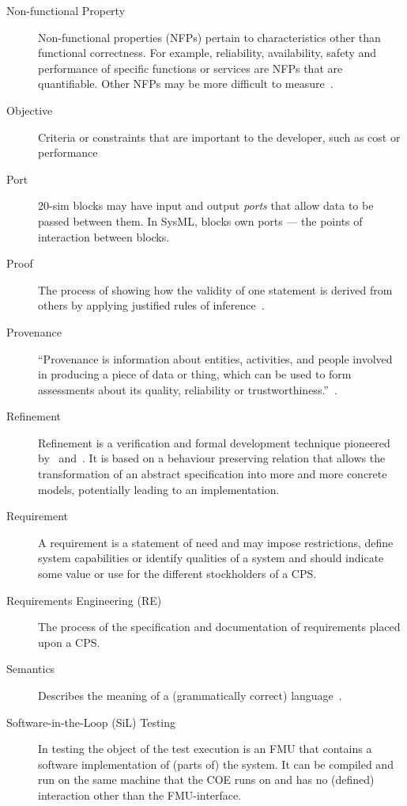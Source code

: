 \begin{description}
\item[Non-functional Property] Non-functional properties (NFPs) pertain to characteristics other than functional correctness. For example, reliability, availability, safety and performance of specific functions or services are NFPs that are quantifiable. Other NFPs may be more difficult to measure~\cite{Payne&10}.

\item[Objective] Criteria or constraints that are important to the developer, such as cost or performance

\item[Port] 20-sim blocks may have input and output \emph{ports} that allow data to be passed between them. In SysML, blocks own ports --- the points of interaction between blocks.

\item[Proof] The process of showing how the validity of one statement is derived from others by applying justified rules of inference~\cite{Bicarregui&94}.

\item[Provenance] ``Provenance is information about entities, activities, and people involved in producing a piece of data or thing, which can be used to form assessments about its quality, reliability or trustworthiness.''~\cite{Moreau&13}.

\item[Refinement] Refinement is a verification and formal development technique pioneered by~\cite{Back&98} and~\cite{Morgan90a}. It is based on a behaviour preserving relation that allows the transformation of an abstract specification into more and more concrete models, potentially leading to an implementation.

\item[Requirement] A requirement is a statement of need and may impose restrictions, define system capabilities or identify qualities of a system and should indicate some value or use for the different stockholders of a CPS.

\item[Requirements Engineering (RE)] The process of the specification and documentation of requirements placed upon a CPS.

\item[Semantics] Describes the meaning of a (grammatically correct) language~\cite{Nielson&92}.

\item[Software-in-the-Loop (SiL) Testing] In  testing the object of the test execution is an FMU that contains a software implementation of (parts of) the system. It can be compiled and run on the same machine that the COE runs on and has no (defined) interaction other than the FMU-interface.


\end{description}

